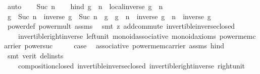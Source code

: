 \begin{isabellebody}
\ auto\isanewline
{}\isamarkupfalse%
\isanewline
\ \ \isamarkupfalse%
\ {\isacharparenleft}{\kern0pt}Suc\ n{\isacharparenright}{\kern0pt}\isanewline
\ \ \isamarkupfalse%
\ hind{\isacharcolon}{\kern0pt}\ {\isachardoublequoteopen}g\ {\isacharcircum}{\kern0pt}\ n\ {\isasymcdot}\ local{\isachardot}{\kern0pt}inverse\ g\ {\isacharcircum}{\kern0pt}\ n\ {\isacharequal}{\kern0pt}\ {\isasymone}{\isachardoublequoteclose}\isanewline
\ \ \isamarkupfalse%
\ \isamarkupfalse%
\ {\isachardoublequoteopen}g\ {\isacharcircum}{\kern0pt}\ Suc\ n\ {\isasymcdot}\ inverse\ g\ {\isacharcircum}{\kern0pt}\ Suc\ n\ {\isacharequal}{\kern0pt}\ {\isacharparenleft}{\kern0pt}g\ {\isasymcdot}\ g\ {\isacharcircum}{\kern0pt}\ n{\isacharparenright}{\kern0pt}\ {\isasymcdot}\ {\isacharparenleft}{\kern0pt}inverse\ g\ {\isacharcircum}{\kern0pt}\ n\ {\isasymcdot}\ inverse\ g{\isacharparenright}{\kern0pt}{\isachardoublequoteclose}\ \isanewline
\ \ \ \ \isamarkupfalse%
\ power{\isacharunderscore}{\kern0pt}def\ power{\isacharunderscore}{\kern0pt}mult\ assms\ \isamarkupfalse%
\ {\isacharparenleft}{\kern0pt}smt\ {\isacharparenleft}{\kern0pt}z{}{\isacharparenright}{\kern0pt}\ add{\isachardot}{\kern0pt}commute\ invertible{\isacharunderscore}{\kern0pt}inverse{\isacharunderscore}{\kern0pt}closed\ \isanewline
\ \ \ \ invertible{\isacharunderscore}{\kern0pt}right{\isacharunderscore}{\kern0pt}inverse\ left{\isacharunderscore}{\kern0pt}unit\ monoid{\isachardot}{\kern0pt}associative\ monoid{\isacharunderscore}{\kern0pt}axioms\ power{\isacharunderscore}{\kern0pt}mem{\isacharunderscore}{\kern0pt}carrier\ power{\isacharunderscore}{\kern0pt}suc{\isacharparenright}{\kern0pt}\isanewline
\ \ \isamarkupfalse%
\ \isamarkupfalse%
\ {\isacharquery}{\kern0pt}case\ \isamarkupfalse%
\ associative\ power{\isacharunderscore}{\kern0pt}mem{\isacharunderscore}{\kern0pt}carrier\ assms\ hind\ \isamarkupfalse%
\ {\isacharparenleft}{\kern0pt}smt\ {\isacharparenleft}{\kern0pt}verit{\isacharcomma}{\kern0pt}\ del{\isacharunderscore}{\kern0pt}insts{\isacharparenright}{\kern0pt}\ \isanewline
\ \ \ \ composition{\isacharunderscore}{\kern0pt}closed\ invertible{\isacharunderscore}{\kern0pt}inverse{\isacharunderscore}{\kern0pt}closed\ invertible{\isacharunderscore}{\kern0pt}right{\isacharunderscore}{\kern0pt}inverse\ right{\isacharunderscore}{\kern0pt}unit{\isacharparenright}{\kern0pt}\isanewline
{}\isamarkupfalse%
%
\endisatagproof
{\isafoldproof}%

\end{isabellebody}

